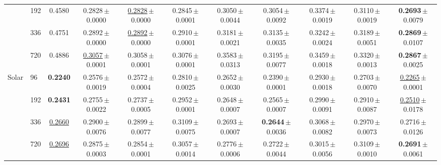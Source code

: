\begin{tabular}{llccccccccc}
 & 192 & 0.4580 & 0.2828\,{\tiny$\pm$0.0000} & \underline{0.2828}\,{\tiny$\pm$0.0000} & 0.2845\,{\tiny$\pm$0.0001} & 0.3050\,{\tiny$\pm$0.0044} & 0.3054\,{\tiny$\pm$0.0092} & 0.3374\,{\tiny$\pm$0.0019} & 0.3110\,{\tiny$\pm$0.0019} & \textbf{0.2693}\,{\tiny$\pm$0.0079} \\
 & 336 & 0.4751 & 0.2892\,{\tiny$\pm$0.0000} & \underline{0.2892}\,{\tiny$\pm$0.0000} & 0.2910\,{\tiny$\pm$0.0001} & 0.3181\,{\tiny$\pm$0.0021} & 0.3135\,{\tiny$\pm$0.0035} & 0.3242\,{\tiny$\pm$0.0024} & 0.3189\,{\tiny$\pm$0.0051} & \textbf{0.2869}\,{\tiny$\pm$0.0107} \\
 & 720 & 0.4886 & \underline{0.3057}\,{\tiny$\pm$0.0001} & 0.3058\,{\tiny$\pm$0.0001} & 0.3076\,{\tiny$\pm$0.0001} & 0.3583\,{\tiny$\pm$0.0313} & 0.3195\,{\tiny$\pm$0.0077} & 0.3459\,{\tiny$\pm$0.0018} & 0.3320\,{\tiny$\pm$0.0013} & \textbf{0.2867}\,{\tiny$\pm$0.0025} \\
\midrule
\multirow{4}{*}{Solar} & 96 & \textbf{0.2240} & 0.2576\,{\tiny$\pm$0.0019} & 0.2572\,{\tiny$\pm$0.0004} & 0.2810\,{\tiny$\pm$0.0025} & 0.2652\,{\tiny$\pm$0.0030} & 0.2390\,{\tiny$\pm$0.0001} & 0.2930\,{\tiny$\pm$0.0018} & 0.2703\,{\tiny$\pm$0.0070} & \underline{0.2265}\,{\tiny$\pm$0.0001} \\
 & 192 & \textbf{0.2431} & 0.2755\,{\tiny$\pm$0.0022} & 0.2737\,{\tiny$\pm$0.0005} & 0.2952\,{\tiny$\pm$0.0001} & 0.2648\,{\tiny$\pm$0.0007} & 0.2565\,{\tiny$\pm$0.0007} & 0.2990\,{\tiny$\pm$0.0091} & 0.2910\,{\tiny$\pm$0.0087} & \underline{0.2510}\,{\tiny$\pm$0.0178} \\
 & 336 & \underline{0.2660} & 0.2900\,{\tiny$\pm$0.0076} & 0.2899\,{\tiny$\pm$0.0077} & 0.3109\,{\tiny$\pm$0.0075} & 0.2693\,{\tiny$\pm$0.0007} & \textbf{0.2644}\,{\tiny$\pm$0.0036} & 0.3068\,{\tiny$\pm$0.0082} & 0.2970\,{\tiny$\pm$0.0073} & 0.2716\,{\tiny$\pm$0.0126} \\
 & 720 & \underline{0.2696} & 0.2875\,{\tiny$\pm$0.0003} & 0.2854\,{\tiny$\pm$0.0001} & 0.3057\,{\tiny$\pm$0.0014} & 0.2776\,{\tiny$\pm$0.0006} & 0.2722\,{\tiny$\pm$0.0044} & 0.3015\,{\tiny$\pm$0.0056} & 0.3109\,{\tiny$\pm$0.0010} & \textbf{0.2691}\,{\tiny$\pm$0.0061} \\
\bottomrule
\end{tabular}
